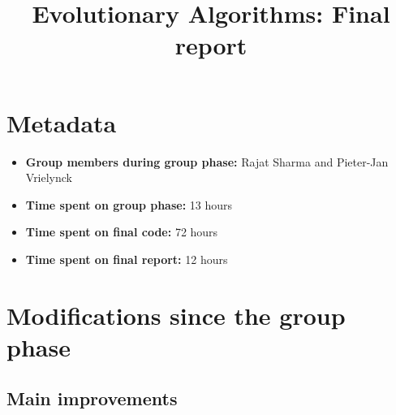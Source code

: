 \documentclass[a4paper,10pt]{article}
\title{Evolutionary Algorithms: Final report}
\author{\ReplaceMe{Stijn Staring (r0620003)}}
\newcommand{\ReplaceMe}[1]{{\color{blue}#1}}
\newcommand{\RemoveMe}[1]{{\color{purple}#1}}
\begin{document}
\selectfont{}

\maketitle


\section{Metadata}

\begin{itemize}
 \item \textbf{Group members during group phase:} Rajat Sharma and
 Pieter-Jan Vrielynck \\
 \item \textbf{Time spent on group phase:} \ReplaceMe{13 hours}
 \item \textbf{Time spent on final code:} \ReplaceMe{72 hours}
 \item \textbf{Time spent on final report:} \ReplaceMe{12 hours}\\
\end{itemize}

\section{Modifications since the group phase}


\subsection{Main improvements}



\end{document}
